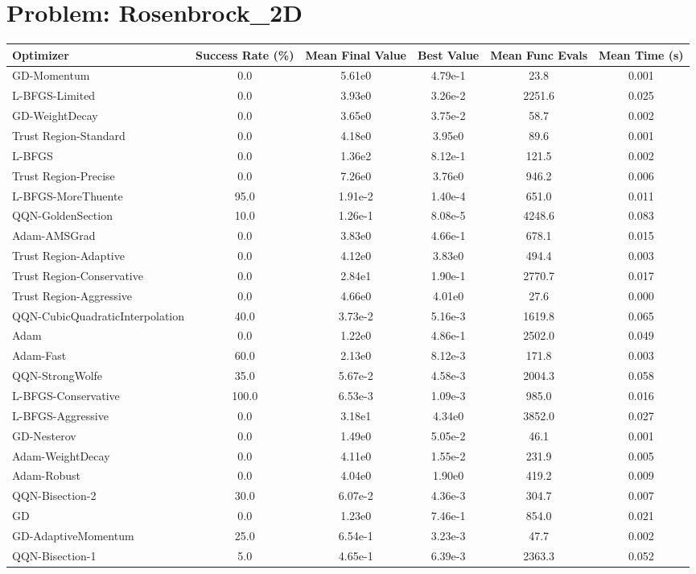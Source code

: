 \documentclass{article}
\begin{document}
\section{Problem: Rosenbrock\_2D}
\begin{longtable}{p{3cm}*{5}{c}}
\toprule
\textbf{Optimizer} & \textbf{Success Rate (\%)} & \textbf{Mean Final Value} & \textbf{Best Value} & \textbf{Mean Func Evals} & \textbf{Mean Time (s)} \\
\midrule
GD-Momentum & 0.0 & 5.61e0 & 4.79e-1 & 23.8 & 0.001 \\
L-BFGS-Limited & 0.0 & 3.93e0 & 3.26e-2 & 2251.6 & 0.025 \\
GD-WeightDecay & 0.0 & 3.65e0 & 3.75e-2 & 58.7 & 0.002 \\
Trust Region-Standard & 0.0 & 4.18e0 & 3.95e0 & 89.6 & 0.001 \\
L-BFGS & 0.0 & 1.36e2 & 8.12e-1 & 121.5 & 0.002 \\
Trust Region-Precise & 0.0 & 7.26e0 & 3.76e0 & 946.2 & 0.006 \\
L-BFGS-MoreThuente & 95.0 & 1.91e-2 & 1.40e-4 & 651.0 & 0.011 \\
QQN-GoldenSection & 10.0 & 1.26e-1 & 8.08e-5 & 4248.6 & 0.083 \\
Adam-AMSGrad & 0.0 & 3.83e0 & 4.66e-1 & 678.1 & 0.015 \\
Trust Region-Adaptive & 0.0 & 4.12e0 & 3.83e0 & 494.4 & 0.003 \\
Trust Region-Conservative & 0.0 & 2.84e1 & 1.90e-1 & 2770.7 & 0.017 \\
Trust Region-Aggressive & 0.0 & 4.66e0 & 4.01e0 & 27.6 & 0.000 \\
QQN-CubicQuadraticInterpolation & 40.0 & 3.73e-2 & 5.16e-3 & 1619.8 & 0.065 \\
Adam & 0.0 & 1.22e0 & 4.86e-1 & 2502.0 & 0.049 \\
Adam-Fast & 60.0 & 2.13e0 & 8.12e-3 & 171.8 & 0.003 \\
QQN-StrongWolfe & 35.0 & 5.67e-2 & 4.58e-3 & 2004.3 & 0.058 \\
L-BFGS-Conservative & 100.0 & 6.53e-3 & 1.09e-3 & 985.0 & 0.016 \\
L-BFGS-Aggressive & 0.0 & 3.18e1 & 4.34e0 & 3852.0 & 0.027 \\
GD-Nesterov & 0.0 & 1.49e0 & 5.05e-2 & 46.1 & 0.001 \\
Adam-WeightDecay & 0.0 & 4.11e0 & 1.55e-2 & 231.9 & 0.005 \\
Adam-Robust & 0.0 & 4.04e0 & 1.90e0 & 419.2 & 0.009 \\
QQN-Bisection-2 & 30.0 & 6.07e-2 & 4.36e-3 & 304.7 & 0.007 \\
GD & 0.0 & 1.23e0 & 7.46e-1 & 854.0 & 0.021 \\
GD-AdaptiveMomentum & 25.0 & 6.54e-1 & 3.23e-3 & 47.7 & 0.002 \\
QQN-Bisection-1 & 5.0 & 4.65e-1 & 6.39e-3 & 2363.3 & 0.052 \\
\bottomrule
\end{longtable}
\end{document}

